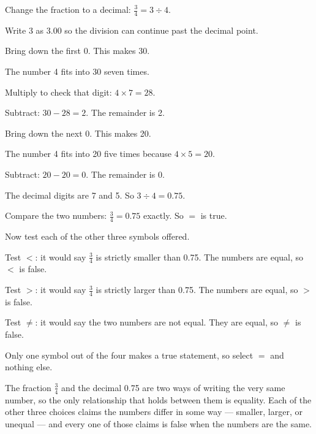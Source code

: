 \begin{steps}
  \item Change the fraction to a decimal: $\frac{3}{4} = 3 \div 4$.
  \item Write 3 as 3.00 so the division can continue past the decimal point.
  \item Bring down the first 0. This makes 30.
  \item The number 4 fits into 30 seven times.
  \item Multiply to check that digit: $4 \times 7 = 28$.
  \item Subtract: $30 - 28 = 2$. The remainder is 2.
  \item Bring down the next 0. This makes 20.
  \item The number 4 fits into 20 five times because $4 \times 5 = 20$.
  \item Subtract: $20 - 20 = 0$. The remainder is 0.
  \item The decimal digits are 7 and 5. So $3 \div 4 = 0.75$.
  \item Compare the two numbers: $\frac{3}{4} = 0.75$ exactly. So $=$ is true.
  \item Now test each of the other three symbols offered.
  \item Test $<$: it would say $\frac{3}{4}$ is strictly smaller than 0.75. The numbers are equal,
        so $<$ is false.
  \item Test $>$: it would say $\frac{3}{4}$ is strictly larger than 0.75. The numbers are equal,
        so $>$ is false.
  \item Test $\neq$: it would say the two numbers are not equal. They are equal, so $\neq$ is false.
  \item Only one symbol out of the four makes a true statement, so select $=$ and nothing else.
\end{steps}


The fraction $\frac{3}{4}$ and the decimal 0.75 are two ways of writing the very same number, so the only relationship that holds between them is equality. Each of the other three choices claims the numbers differ in some way --- smaller, larger, or unequal --- and every one of those claims is false when the numbers are the same.



